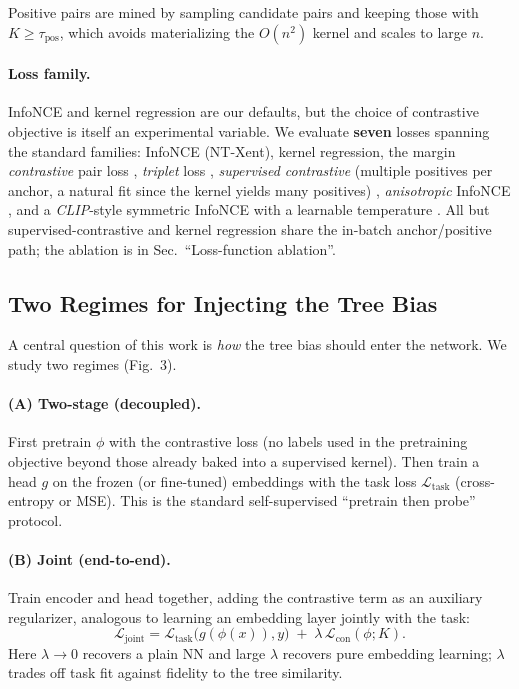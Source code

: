 \documentclass[11pt]{article}
\begin{document}
Positive pairs are mined by sampling candidate pairs and keeping those with
$K\!\ge\!\tau_{\text{pos}}$, which avoids materializing the $O(n^2)$ kernel and
scales to large $n$.

\paragraph{Loss family.} InfoNCE and kernel regression are our defaults, but the
choice of contrastive objective is itself an experimental variable. We evaluate
\textbf{seven} losses spanning the standard families: InfoNCE (NT-Xent),
kernel regression, the margin \emph{contrastive} pair loss \cite{hadsell2006},
\emph{triplet} loss \cite{schroff2015}, \emph{supervised contrastive}
(multiple positives per anchor, a natural fit since the kernel yields many
positives) \cite{khosla2020}, \emph{anisotropic} InfoNCE \cite{aninfonce}, and a
\emph{CLIP}-style symmetric InfoNCE with a learnable temperature \cite{clip}.
All but supervised-contrastive and kernel regression share the in-batch
anchor/positive path; the ablation is in Sec.~``Loss-function ablation''.

\subsection{Two Regimes for Injecting the Tree Bias}

A central question of this work is \emph{how} the tree bias should enter the
network. We study two regimes (Fig.~3).

\paragraph{(A) Two-stage (decoupled).} First pretrain $\phi$ with the contrastive
loss (no labels used in the pretraining objective beyond those already baked into
a supervised kernel). Then train a head $g$ on the frozen (or fine-tuned)
embeddings with the task loss $\mathcal{L}_{\text{task}}$ (cross-entropy or MSE).
This is the standard self-supervised ``pretrain then probe'' protocol.

\paragraph{(B) Joint (end-to-end).} Train encoder and head together, adding the
contrastive term as an auxiliary regularizer, analogous to learning an embedding
layer jointly with the task:
\begin{equation}
\mathcal{L}_{\text{joint}}=\mathcal{L}_{\text{task}}\big(g(\phi(x)),y\big)
\;+\;\lambda\,\mathcal{L}_{\text{con}}(\phi;K).
\label{eq:joint}
\end{equation}
Here $\lambda\!\to\!0$ recovers a plain NN and large $\lambda$ recovers pure
embedding learning; $\lambda$ trades off task fit against fidelity to the tree
similarity.
\end{document}
